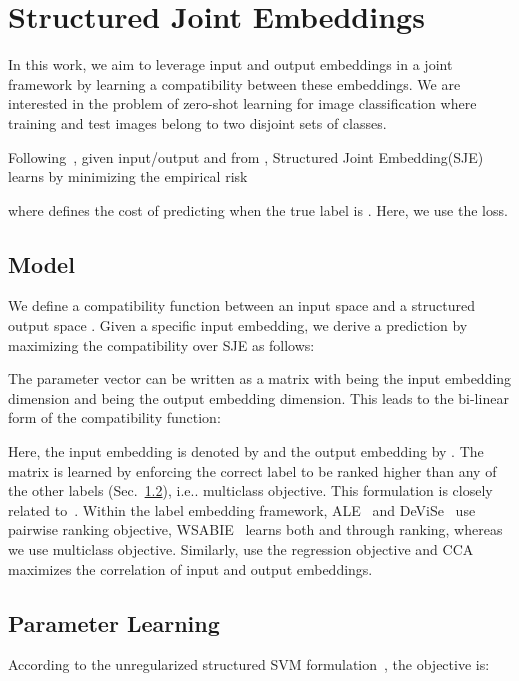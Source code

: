 \documentclass[10pt,twocolumn,letterpaper]{article}
\makeatletter
\newcommand{\SJElong}{Structured Joint Embedding\xspace}
\newcommand{\SJE}{SJE\xspace}
\DeclareRobustCommand\onedot{\futurelet\@let@token\@onedot}
\def\@onedot{\ifx\@let@token.\else.\null\fi\xspace}
\def\ie{{i.e}\onedot} \def\Ie{{I.e}\onedot}
\makeatother
\begin{document}
\section{{\SJElong}s}
\label{sec:model}

In this work, we aim to leverage input and output embeddings in a joint framework by learning a compatibility between these embeddings. We are interested in the problem of zero-shot learning for image classification where training and test images belong to two disjoint sets of classes. 

Following~\cite{APHS13}, given input/output  and  from , \SJElong (\SJE) learns  by minimizing the empirical risk
 
where  defines the cost of predicting  when the true label is . Here, we use the  loss.

\subsection{Model} 
\label{subsec:model}
We define a compatibility function  between an input space  and a structured output space . Given a specific input embedding, we derive a prediction by maximizing the compatibility  over \SJE as follows:

The parameter vector  can be written as a  matrix  with  being the input embedding dimension and  being the output embedding dimension. This leads to the bi-linear form of the compatibility function:

Here, the input embedding is denoted by  and the output embedding by . The matrix  is learned by enforcing the correct label to be ranked higher than any of the other labels (Sec.~\ref{subsec:learning}), \ie multiclass objective. This formulation is closely related to~\cite{APHS13, FCSBM13, WBU10}. Within the label embedding framework, ALE~\cite{APHS13} and DeViSe~\cite{FCSBM13} use pairwise ranking objective, WSABIE~\cite{WBU10} learns both  and  through ranking, whereas we use multiclass objective. Similarly, \cite{PPH09,SGSBMN13} use the regression objective and CCA~\cite{Hastie:Tibshirani:Friedman:2008} maximizes the correlation of input and output embeddings. 

\subsection{Parameter Learning} 
\label{subsec:learning}
According to the unregularized structured SVM formulation~\cite{TJH05}, the objective is:
\end{document}
